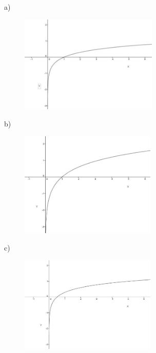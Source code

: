 \begin{respostas}{7}
	\ansitem{} a) 

    \begin{figure}[H]
	    \begin{Center}
    		\includegraphics[width=2.58in,height=1.83in]{capitulos/logaritmos_e_funcao_logaritmica/media/image19.jpeg}
    	\end{Center}
    \end{figure}

b)

    \begin{figure}[H]
	    \begin{Center}
    		\includegraphics[width=2.55in,height=1.98in]{capitulos/logaritmos_e_funcao_logaritmica/media/image20.jpeg}
	    \end{Center}
    \end{figure}

c)

    \begin{figure}[H]
	    \begin{Center}
		    \includegraphics[width=2.56in,height=1.81in]{capitulos/logaritmos_e_funcao_logaritmica/media/image21.jpeg}
	    \end{Center}
    \end{figure}


\end{respostas}
